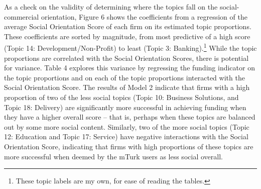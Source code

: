 \documentclass[12pt]{article}
\begin{document}
As a check on the validity of determining where the topics fall on the social-commercial orientation, Figure 6 shows the coefficients from a regression of the average Social Orientation Score of each firm on its estimated topic proportions. These coefficients are sorted by magnitude, from most predictive of a high score (Topic 14: Development/Non-Profit) to least (Topic 3: Banking).\footnote{These topic labels are my own, for ease of reading the tables.} While the topic proportions are correlated with the Social Orientation Scores, there is potential for variance. Table 4 explores this variance by regressing the funding indicator on the topic proportions and on each of the topic proportions interacted with the Social Orientation Score. The results of Model 2 indicate that firms with a high proportion of two of the less social topics (Topic 10: Business Solutions, and Topic 18: Delivery) are significantly more successful in achieving funding when they have a higher overall score -- that is, perhaps when these topics are balanced out by some more social content. Similarly, two of the more social topics (Topic 12: Education and Topic 17: Service) have negative interactions with the Social Orientation Score, indicating that firms with high proportions of these topics are more successful when deemed by the mTurk users as less social overall.
\end{document}
